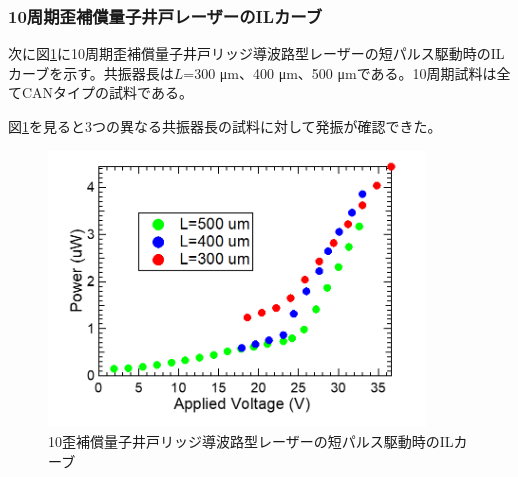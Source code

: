 {\newpage
\subsubsection{10周期歪補償量子井戸レーザーのILカーブ}
次に図\ref{fig:fig_3_2_10QW_ridge_GS_power}に10周期歪補償量子井戸リッジ導波路型レーザーの短パルス駆動時のILカーブを示す。共振器長は$L$=300 \si{\micro\metre}、400 \si{\micro\metre}、500 \si{\micro\metre}である。10周期試料は全てCANタイプの試料である。

図\ref{fig:fig_3_2_10QW_ridge_GS_power}を見ると3つの異なる共振器長の試料に対して発振が確認できた。
\begin{figure}[h]
	\centering
	\includegraphics[width=10cm]{figure/fig_3_2_10QW_ridge_GS_power.png}
		\caption{10歪補償量子井戸リッジ導波路型レーザーの短パルス駆動時のILカーブ}
		\label{fig:fig_3_2_10QW_ridge_GS_power}
\end{figure}
\clearpage
}
